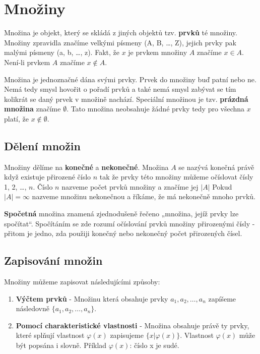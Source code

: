 \section{Množiny}
Množina je objekt, který se skládá z jiných objektů tzv. \textbf{prvků} té množiny. Množiny zpravidla značíme velkými písmeny (A, B, \dots, Z), jejich prvky pak malými písmeny (a, b, \dots, z). Fakt, že $x$ je prvkem množiny $A$ značíme $x \in A$. Není-li prvkem $A$ značíme $x \not\in A$.

Množina je jednoznačné dána svými prvky. Prvek do množiny buď patní nebo ne. Nemá tedy smysl hovořit o pořadí prvků a také nemá smysl zabývat se tím kolikrát se daný prvek v množině nachází.
Speciální množinou je tzv. \textbf{prázdná množina} značíme $\emptyset$. Tato množina neobsahuje žádné prvky tedy pro všechna $x$ platí, že $x \not\in \emptyset$.

\subsection{Dělení množin}
Množiny dělíme na \textbf{konečné} a \textbf{nekonečné}. Množina $A$ se nazývá konečná právě když existuje přirozené číslo $n$ tak že prvky této množiny můžeme očíslovat čísly 1, 2, \dots, $n$. Číslo $n$ nazveme počet prvků množiny a značíme jej $|A|$
Pokud $|A| = \infty$ nazveme množinu nekonečnou a říkáme, že má nekonečně mnoho prvků.

\textbf{Spočetná} množina znamená zjednodušeně řečeno „množina, jejíž prvky lze spočítat“. Spočítáním se zde rozumí očíslování prvků množiny přirozenými čísly - přitom je jedno, zda použiji konečný nebo nekonečný počet přirozených čísel.

\subsection{Zapisování množin}
Množiny můžeme zapisovat následujícími způsoby:
\begin{enumerate}
	\item \textbf{Výčtem prvků} - Množinu která obsahuje prvky $a_1,a_2,\dots,a_n$ zapíšeme následovně $\{a_1,a_2,\dots,a_n\}$.
	\item \textbf{Pomocí charakteristické vlastnosti} - Množina obsahuje právě ty prvky, které splňují vlastnost $\varphi(x)$ zapisujeme $\{x | \varphi(x)\}$. Vlastnost $\varphi(x)$ může být popsána i slovně. Příklad $\varphi(x)$: číslo x je sudé.
\end{enumerate}
